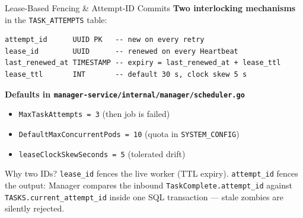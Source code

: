 \documentclass[11pt]{beamer}
\begin{document}
\begin{frame}[fragile]{Lease-Based Fencing \& Attempt-ID Commits}
\textbf{Two interlocking mechanisms} in the \texttt{TASK\_ATTEMPTS} table:

\vspace{0.7em}
\begin{lstlisting}
attempt_id      UUID PK   -- new on every retry
lease_id        UUID      -- renewed on every Heartbeat
last_renewed_at TIMESTAMP -- expiry = last_renewed_at + lease_ttl
lease_ttl       INT       -- default 30 s, clock skew 5 s
\end{lstlisting}
\vspace{0.5em}

\textbf{Defaults in \texttt{manager-service/internal/manager/scheduler.go}}
\begin{itemize}\small
  \item \texttt{MaxTaskAttempts = 3} (then job is failed)
  \item \texttt{DefaultMaxConcurrentPods = 10} (quota in \texttt{SYSTEM\_CONFIG})
  \item \texttt{leaseClockSkewSeconds = 5} (tolerated drift)
\end{itemize}

\begin{alertblock}{Why two IDs?}
\texttt{lease\_id} fences the \alert{live} worker (TTL expiry).
\texttt{attempt\_id} fences the \alert{output}: Manager compares the inbound
\texttt{TaskComplete.attempt\_id} against \texttt{TASKS.current\_attempt\_id}
inside one SQL transaction --- stale zombies are silently rejected.
\end{alertblock}
\end{frame}
\end{document}
